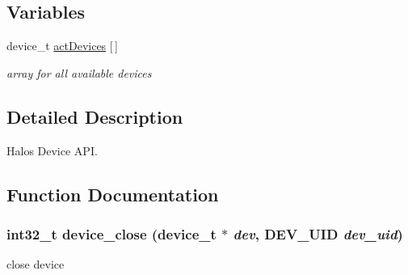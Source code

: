 \subsection*{Variables}
\begin{CompactItemize}
\item 
\hypertarget{group___d_e_v_i_c_e___a_p_i_ga20a83acab6e9ba5c69b47092a295521}{
device\_\-t \hyperlink{group___d_e_v_i_c_e___a_p_i_ga20a83acab6e9ba5c69b47092a295521}{actDevices} \mbox{[}$\,$\mbox{]}}
\label{group___d_e_v_i_c_e___a_p_i_ga20a83acab6e9ba5c69b47092a295521}

\begin{CompactList}\small\item\em array for all available devices \item\end{CompactList}\end{CompactItemize}


\subsection{Detailed Description}
Halos Device API. 

\subsection{Function Documentation}
\hypertarget{group___d_e_v_i_c_e___a_p_i_gca0e04a4b3f9379a4d094ca2dcd4388b}{
\subsubsection[{device\_\-close}]{\setlength{\rightskip}{0pt plus 5cm}int32\_\-t device\_\-close (device\_\-t $\ast$ {\em dev}, \/  {\bf DEV\_\-UID} {\em dev\_\-uid})}}
\label{group___d_e_v_i_c_e___a_p_i_gca0e04a4b3f9379a4d094ca2dcd4388b}


close device 

